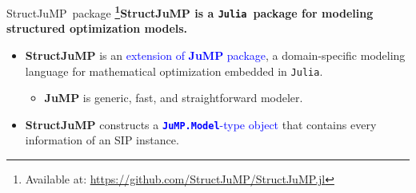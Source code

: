 \documentclass[usenames,dvipsnames]{beamer}
\newcommand{\jump}{\textsf{JuMP}}
\newcommand{\structjump}{\textsf{StructJuMP}}
\newcommand{\julia}{\texttt{Julia}}
\newcommand{\jumpmodel}{\texttt{JuMP.Model}}
\begin{document}
\begin{frame}{\structjump\ package}
\textbf{\footnote{\tiny Available at: \href{https://github.com/StructJuMP/StructJuMP.jl}{https://github.com/StructJuMP/StructJuMP.jl}}{\structjump} is a \julia\ package for modeling structured optimization models.}
\begin{itemize}
\item \textbf{\structjump} is an \textcolor{blue}{extension of \textbf{\jump} package}, a domain-specific modeling language for mathematical optimization embedded in \julia.
\begin{itemize}
\item \textbf{\jump} is generic, fast, and straightforward modeler.
\end{itemize}
\item \textbf{\structjump} constructs a \textcolor{blue}{\textbf{\jumpmodel}-type object} that contains every information of an SIP instance.
\end{itemize}
\end{frame}
\end{document}
